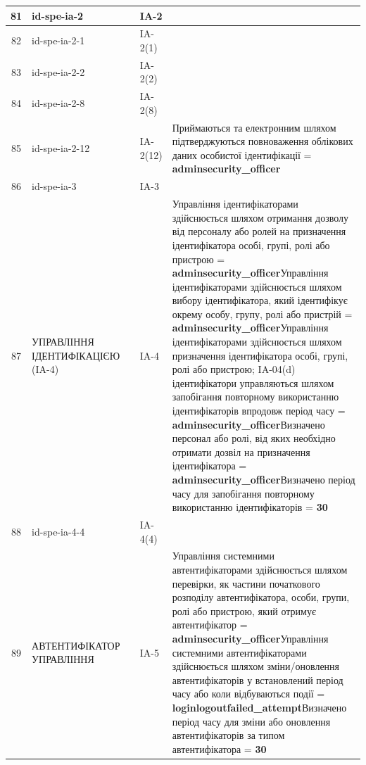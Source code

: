 \documentclass[10pt]{article}
\begin{document}
\begin{longtable}{|c|>{\raggedright\arraybackslash}p{4cm}|>{\raggedright\arraybackslash}p{2.5cm}|>{\raggedright\arraybackslash}p{3.5cm}|>{\raggedright\arraybackslash}p{5.5cm}|}
81 & id-spe-ia-2 &  & IA-2 &  \\ \hline
82 & id-spe-ia-2-1 &  & IA-2(1) &  \\ \hline
83 & id-spe-ia-2-2 &  & IA-2(2) &  \\ \hline
84 & id-spe-ia-2-8 &  & IA-2(8) &  \\ \hline
85 & id-spe-ia-2-12 &  & IA-2(12) & Приймаються та електронним шляхом підтверджуються повноваження облікових даних особистої ідентифікації = \textbf{adminsecurity\_\allowbreak{}officer} \\ \hline
86 & id-spe-ia-3 &  & IA-3 &  \\ \hline
87 & УПРАВЛІННЯ ІДЕНТИФІКАЦІЄЮ (IA-4) &  & IA-4 & Управління ідентифікаторами здійснюється шляхом отримання дозволу від персоналу або ролей на призначення ідентифікатора особі, групі, ролі або пристрою = \textbf{adminsecurity\_\allowbreak{}officer}\newline Управління ідентифікаторами здійснюється шляхом вибору ідентифікатора, який ідентифікує окрему особу, групу, ролі або пристрій = \textbf{adminsecurity\_\allowbreak{}officer}\newline Управління ідентифікаторами здійснюється шляхом призначення ідентифікатора особі, групі, ролі або пристрою; IA-04(d) ідентифікатори управляються шляхом запобігання повторному використанню ідентифікаторів впродовж період часу = \textbf{adminsecurity\_\allowbreak{}officer}\newline Визначено персонал або ролі, від яких необхідно отримати дозвіл на призначення ідентифікатора = \textbf{adminsecurity\_\allowbreak{}officer}\newline Визначено період часу для запобігання повторному використанню ідентифікаторів = \textbf{30} \\ \hline
88 & id-spe-ia-4-4 &  & IA-4(4) &  \\ \hline
89 & АВТЕНТИФІКАТОР УПРАВЛІННЯ &  & IA-5 & Управління системними автентифікаторами здійснюється шляхом перевірки, як частини початкового розподілу автентифікатора, особи, групи, ролі або пристрою, який отримує автентифікатор = \textbf{adminsecurity\_\allowbreak{}officer}\newline Управління системними автентифікаторами здійснюється шляхом зміни/оновлення автентифікаторів у встановлений період часу або коли відбуваються події = \textbf{loginlogoutfailed\_\allowbreak{}attempt}\newline Визначено період часу для зміни або оновлення автентифікаторів за типом автентифікатора = \textbf{30} \\ \hline

\end{longtable}
\end{document}

